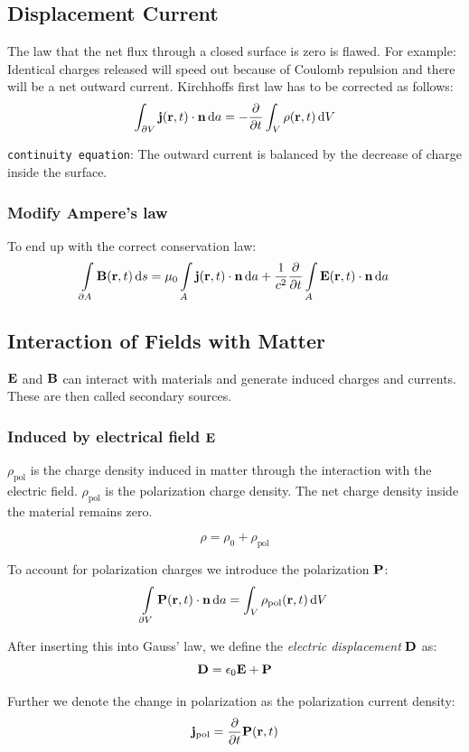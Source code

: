 \documentclass[a4paper, fontsize=8pt, landscape, DIV=1]{scrartcl}
\begin{document}
\begin{multicols*}{4}
  \subsection{Displacement Current}
  The law that the net flux through a closed surface is zero is flawed. For example: Identical charges released will speed out because of Coulomb repulsion and there will be a net outward current. Kirchhoffs first law has to be corrected as follows:
  \[\int_{\partial V} \mathbf{j}(\mathbf{r},t) \cdot \mathbf{n} \,\mathrm{d} a = -\frac{\partial}{\partial t} \int_V  \rho(\mathbf{r},t) \,\mathrm{d} V\]

  \texttt{continuity equation}: The outward current is balanced by the decrease of charge inside the surface.

  \subsubsection{Modify Ampere's law}
  To end up with the correct conservation law:
  \[\int\displaylimits_{\partial A}\mathbf{B}(\mathbf{r},t)\,\mathrm{d} s = \mu_0\int\displaylimits_A\mathbf{j}(\mathbf{r},t)\cdot \mathbf{n} \,\mathrm{d} a + \frac{1}{c^2}\frac{\partial}{\partial t}\int\displaylimits_A \mathbf{E}(\mathbf{r},t)\cdot \mathbf{n}\,\mathrm{d} a\]

  \subsection{Interaction of Fields with Matter}
  $\mathbf{E}$ and $\mathbf{B}$ can interact with materials and generate induced charges and currents. These are then called secondary sources.

  \subsubsection{Induced by electrical field $\mathbf{E}$}
  $\rho_{\text{pol}}$ is the charge density induced in matter through the interaction with the electric field. $\rho_{\text{pol}}$ is the polarization charge density. The net charge density inside the material remains zero.

  \[\rho = \rho_0 + \rho_{\text{pol}}\]

  To account for polarization charges we introduce the polarization $\mathbf{P}$:
  \[\int\displaylimits_{\partial V}\mathbf{P}(\mathbf{r},t)\cdot\mathbf{n}\,\mathrm{d} a = \int_V \rho_{\text{pol}}(\mathbf{r},t)\,\mathrm{d} V\]

  After inserting this into Gauss' law, we define the \textit{electric displacement} $\mathbf{D}$ as:
  \[\mathbf{D} = \epsilon_0\mathbf{E}+\mathbf{P}\]

  Further we denote the change in polarization as the polarization current density:
  \[\mathbf{j}_\text{pol} = \frac{\partial}{\partial t}\mathbf{P}(\mathbf{r},t)\]
  

\end{multicols*}
\end{document}
